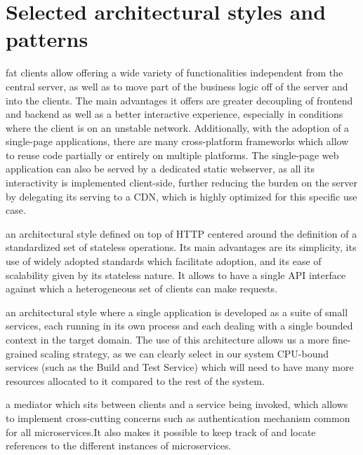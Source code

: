 \section{Selected architectural styles and patterns}
\begin{description}[leftmargin=0pt]
    \item[Fat client:]
          fat clients allow offering a wide variety of functionalities independent from the central server, as well as
          to move part of the business logic off of the server and into the clients.
          The main advantages it offers are greater decoupling of frontend and backend as well as a better interactive
          experience, especially in conditions where the client is on an unstable network.
          Additionally, with the adoption of a single-page applications, there are many cross-platform frameworks
          which allow to reuse code partially or entirely on multiple platforms.
          The single-page web application can also be served by a dedicated static webserver, as all its interactivity is
          implemented client-side, further reducing the burden on the server by delegating its serving to a CDN, which is
          highly optimized for this specific use case.
    \item[REST API:] an architectural style defined on top of HTTP centered around the definition of a standardized
          set of stateless operations. Its main advantages are its simplicity, its use of widely adopted standards which
          facilitate adoption, and its ease of scalability given by its stateless nature. It allows to have a single API
          interface against which a heterogeneous set of clients can make requests.
    \item[Microservices architecture:]
          an architectural style where a single application is developed as a suite of small services,
          each running in its own process and each dealing with a single bounded context in the target domain. The use of
          this architecture allows us a more fine-grained scaling strategy, as we can clearly select in our system CPU-bound
          services (such as the Build and Test Service) which will need to have many more resources allocated to it compared
          to the rest of the system.
    \item[API Gateway:]
          a mediator which sits between clients and a service being invoked, which allows to implement cross-cutting concerns
          such as authentication mechanism common for all microservices.It also makes it possible to keep track of and locate references to the different instances of microservices.

\end{description}
